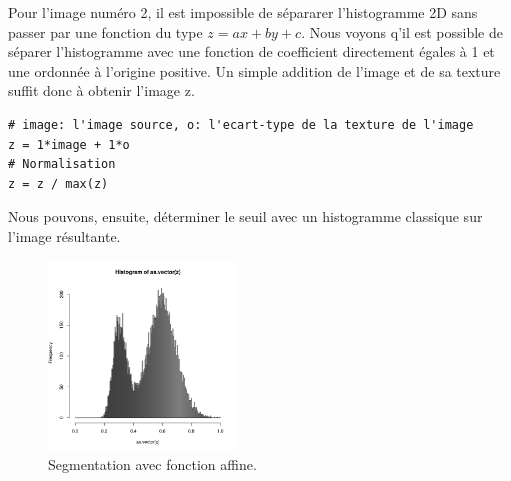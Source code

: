\documentclass[11pt]{article}
\begin{document}
  Pour l'image numéro 2, il est impossible de sépararer l'histogramme 2D sans passer par une fonction 
  du type $z=ax+by+c$. Nous voyons q'il est possible de séparer l'histogramme avec une fonction de 
  coefficient directement égales à 1 et une ordonnée à l'origine positive. Un simple addition de 
  l'image et de sa texture suffit donc à obtenir l'image z.
  
  \begin{lstlisting}[caption=L'équation de la droite en language R.]
# image: l'image source, o: l'ecart-type de la texture de l'image
z = 1*image + 1*o
# Normalisation
z = z / max(z)\end{lstlisting}

  Nous pouvons, ensuite, déterminer le seuil avec un histogramme classique sur l'image résultante.
  
  \begin{figure}[H]
    \center
    \includegraphics[width=5cm]{texture-2/texture-2-8-eq-hist.png}
    \caption{Segmentation avec fonction affine.}
  \end{figure}
  
\end{document}
